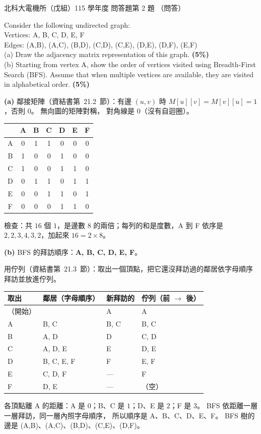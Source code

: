 \begin{pastexam}[label={px:ntut-115-ee-ds-22}]{北科大電機所（戊組）115 學年度 問答題第 2 題}
（問答）

Consider the following undirected graph:\\
Vertices: A, B, C, D, E, F\\
Edges: (A,B), (A,C), (B,D), (C,D), (C,E), (D,E), (D,F), (E,F)\\
(a) Draw the adjacency matrix representation of this graph. \textbf{(5\%)}\\
(b) Starting from vertex A, show the order of vertices visited using Breadth-First Search (BFS). Assume
that when multiple vertices are available, they are visited in alphabetical order. \textbf{(5\%)}
\end{pastexam}

\begin{pastsoln}
\textbf{(a)} 鄰接矩陣（資結書第~21.2~節）：有邊 $(u, v)$ 時 $M[u][v] = M[v][u] = 1$，否則 $0$。 無向圖的矩陣對稱，
對角線是 $0$（沒有自迴圈）。
\begin{center}
\begin{tabular}{c|cccccc}
 & A & B & C & D & E & F \\
\hline
A & 0 & 1 & 1 & 0 & 0 & 0 \\
B & 1 & 0 & 0 & 1 & 0 & 0 \\
C & 1 & 0 & 0 & 1 & 1 & 0 \\
D & 0 & 1 & 1 & 0 & 1 & 1 \\
E & 0 & 0 & 1 & 1 & 0 & 1 \\
F & 0 & 0 & 0 & 1 & 1 & 0 \\
\end{tabular}
\end{center}
檢查：共 $16$ 個 $1$，是邊數 $8$ 的兩倍；每列的和是度數，A 到 F 依序是 $2, 2, 3, 4, 3, 2$，加起來 $16 = 2 \times 8$。

\textbf{(b)} BFS 的拜訪順序：\textbf{A, B, C, D, E, F}。

用佇列（資結書第~21.3~節）：取出一個頂點，把它還沒拜訪過的鄰居依字母順序拜訪並放進佇列。
\begin{center}
\small
\begin{tabular}{llll}
\toprule
取出 & 鄰居（字母順序） & 新拜訪的 & 佇列（前 $\to$ 後） \\
\midrule
（開始） & & A & A \\
A & B, C & B, C & B, C \\
B & A, D & D & C, D \\
C & A, D, E & E & D, E \\
D & B, C, E, F & F & E, F \\
E & C, D, F & — & F \\
F & D, E & — & （空） \\
\bottomrule
\end{tabular}
\end{center}
各頂點離 A 的距離：A 是 $0$；B、C 是 $1$；D、E 是 $2$；F 是 $3$。 BFS 依距離一層一層拜訪，同一層內照字母順序，
所以順序是 A、B、C、D、E、F。 BFS 樹的邊是 (A,B)、(A,C)、(B,D)、(C,E)、(D,F)。
\end{pastsoln}
